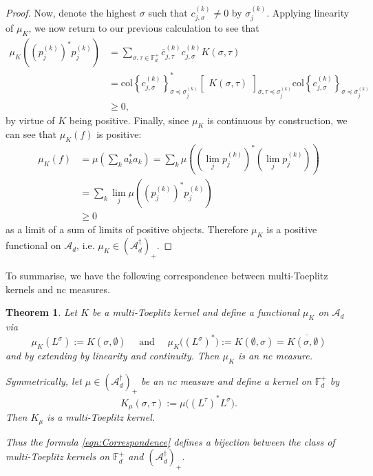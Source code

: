 \documentclass[11pt,reqno]{amsart}
\newcommand\ncm[1]{(\mathscr{A}_{#1}^{\dagger})_+}
\def\s{\sigma}
\def\t{\tau}
\def\FF{\mathbb{F}}
\def\scrA{\mathscr{A}}
\newtheorem{theorem}{Theorem}[section]
\theoremstyle{definition}
\numberwithin{equation}{section}
\begin{document}
\begin{proof}
    Now, denote the highest \(\s\) such that \(c^{(k)}_{j,\s} \neq 0\) by \(\s^{(k)}_{j}\). Applying linearity of \(\mu_K\), we now return to our previous calculation to see that
    \begin{align*}
        \mu_K\left(\left(p^{(k)}_{j}\right)^*p^{(k)}_{j}\right) & = \sum_{\s,\t \in \FF_d^+} \overline{c}^{(k)}_{j,\t}c^{(k)}_{j,\s} K(\s,\t)\\
        & = \mathrm{col} \left\{ c^{(k)}_{j,\s} \right\}_{\s \preceq \s^{(k)}_{j}}^* \begin{bmatrix} K(\s,\t)\end{bmatrix}_{\s,\t \preceq \s^{(k)}_{j}} \mathrm{col}\left\{ c^{(k)}_{j,\s}\right\}_{\s \preceq \s^{(k)}_{j}} \\
        & \geq 0,
    \end{align*}
    by virtue of \(K\) being positive. Finally, since \(\mu_K\) is continuous by construction, we can see that \(\mu_K(f)\) is positive:
    \begin{align*}
        \mu_K(f) & = \mu\left( \sum_k a_k^* a_k\right) = \sum_k \mu \left( (\lim_j p^{(k)}_{j})^* (\lim_j p^{(k)}_{j})\right) \\
        & = \sum_k \lim_j \mu\left( \left(p^{(k)}_{j}\right)^* p^{(k)}_{j} \right) \\
        & \geq 0
    \end{align*}
    as a limit of a sum of limits of positive objects. Therefore \(\mu_K\) is a positive functional on \(\scrA_d\), i.e. \(\mu_K \in \ncm{d}\).
\end{proof}

To summarise, we have the following correspondence between multi-Toeplitz kernels and nc measures.

\begin{theorem}
    \label{thm:Correspondence}
    Let \(K\) be a multi-Toeplitz kernel and define a functional \(\mu_K\) on \(\scrA_d\) via
    \begin{equation*}
        \mu_K(L^\s) := K(\s, \emptyset) \quad \text{ and } \quad \mu_K\big((L^\s)^*\big) := K(\emptyset, \s) = \overline{K(\s, \emptyset)}
    \end{equation*}
    and by extending by linearity and continuity. Then \(\mu_K\) is an nc measure.

    Symmetrically, let \(\mu \in \ncm{d}\) be an nc measure and define a kernel on \(\FF_d^+\) by
    \begin{equation}
        \label{eqn:Correspondence}
        K_{\mu}(\s,\t) := \mu\big((L^{\t})^*L^{\s}\big).
    \end{equation}
    Then \(K_\mu\) is a multi-Toeplitz kernel.

    Thus the formula \eqref{eqn:Correspondence} defines a bijection between the class of multi-Toeplitz kernels on \(\FF_d^+\) and \(\ncm{d}\).
\end{theorem}
\end{document}

